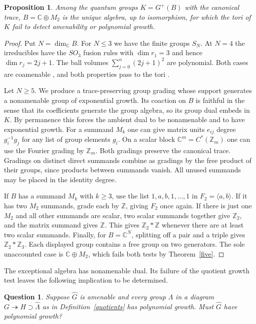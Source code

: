 \documentclass[11pt,a4paper]{article}
\newtheorem{prop}[thm]{Proposition}
\newtheorem{question}[thm]{Question}
\theoremstyle{remark}
\begin{document}
\begin{prop}\label{onlyfive}
Among the quantum groups $K=G^+(B)$ with the canonical
trace, $B=\mathbb C\oplus M_2$ is the unique algebra, up to isomorphism,
for which the tori of $K$ fail to detect amenability or polynomial growth.
\end{prop}
\begin{proof}
Put $N=\dim_{\mathbb C} B$. For $N\le3$ we have the finite groups $S_N$. At $N=4$ the irreducibles
have the $SO_3$ fusion rules with $\dim r_1=3$ and hence
$\dim r_j=2j+1$. The ball volumes $\sum_{j=0}^n(2j+1)^2$ are polynomial.
Both cases are coamenable \cite{generic}, and both properties pass to the
tori \cite{bp,dpr}.

Let $N\ge5$. We produce a trace-preserving group grading whose support
generates a nonamenable group of exponential growth. Its coaction on $B$
is faithful in the sense that its coefficients generate the group algebra,
so its group dual embeds in $K$. By permanence this forces the ambient
dual to be nonamenable and to have exponential growth. For a summand $M_k$ one can give matrix
units $e_{ij}$ degree $g_i^{-1}g_j$ for any list of group elements $g_i$.
On a scalar block $\mathbb C^m=C^*(\mathbb Z_m)$ one can use the Fourier
grading by $\mathbb Z_m$. Both gradings preserve the canonical trace.
Gradings on distinct direct summands combine as gradings by the free
product of their groups, since products between summands vanish.
All unused summands may be placed in the identity degree.

If $B$ has a summand $M_k$ with $k\ge3$, use the list $1,a,b,1,\ldots,1$
in $F_2=\langle a,b\rangle$. If it has two $M_2$ summands, grade each
by $\mathbb Z$, giving $F_2$ once again. If there is just one $M_2$ and
all other summands are scalar, two scalar summands together give
$\mathbb Z_2$, and the matrix summand gives $\mathbb Z$. This gives
$\mathbb Z_2*\mathbb Z$ whenever there are at least two scalar summands.
Finally, for $B=\mathbb C^N$, splitting off a pair and a triple gives
$\mathbb Z_2*\mathbb Z_3$. Each displayed group contains a free group on
two generators. The sole unaccounted case is $\mathbb C\oplus M_2$,
which fails both tests by Theorem~\ref{five}.
\end{proof}

The exceptional algebra has nonamenable dual. Its failure of the quotient
growth test leaves the following implication to be determined.

\begin{question}\label{amenablegrowth}
Suppose $\widehat G$ is amenable and every group $\Lambda$ in a diagram
$G\twoheadrightarrow H\supset\widehat\Lambda$ as in
Definition~\ref{quotients} has polynomial growth. Must $\widehat G$ have
polynomial growth?
\end{question}
\end{document}
